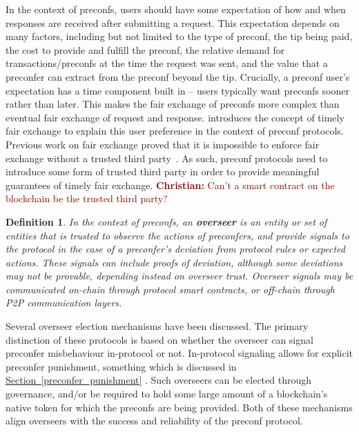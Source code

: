 \documentclass[a4paper]{article}
\theoremstyle{boldstyle}
\newtheorem{definitionx}{Definition}
\newenvironment{definition}
  {\begin{defopenboxq}\begin{definitionx}}
  {\end{definitionx}\end{defopenboxq}}
\newcommand{\chm}[1]{\textcolor{Maroon}{\textbf{Christian:} #1}}
\newcommand{\todoks}[1]{\todo[color=purple!40]{\textbf{Katerina:} #1}}
\begin{document}
    In the context of preconfs, users should have some expectation of how and when responses are received after submitting a request. This expectation depends on many factors, including but not limited to the type of preconf, the tip being paid, the cost to provide and fulfill the preconf, the relative demand for transactions/preconfs at the time the request was sent, and the value that a preconfer can extract from the preconf beyond the tip. Crucially, a preconf user's expectation has a time component built in -- users typically want preconfs sooner rather than later. This makes the fair exchange of preconfs more complex than eventual fair exchange of request and response. \cite{W:PreconfirmationFairExchange} introduces the concept of timely fair exchange to explain this user preference in the context of preconf protocols. Previous work on fair exchange proved that it is impossible to enforce fair exchange without a trusted third party~\cite{P:OntheImpossibilityofFairExchangewithoutaTrustedThirdParty}. As such, preconf protocols need to introduce some form of trusted third party in order to provide meaningful guarantees of timely fair exchange. \chm{Can't a smart contract on the blockchain be the trusted third party?}
    
    \begin{definition}
    \label{def:overseer}
    In the context of preconfs, an \textbf{overseer} is an entity or set of entities that is trusted to observe the actions of preconfers, and provide signals to the protocol in the case of a preconfer's deviation from protocol rules or expected actions. These signals can include proofs of deviation, although some deviations may not be provable, depending instead on overseer trust. Overseer signals may be communicated on-chain through protocol smart contracts, or off-chain through P2P communication layers.
    \end{definition}

    Several overseer election mechanisms have been discussed. The primary distinction of these protocols is based on whether the overseer can signal preconfer misbehaviour in-protocol or not. In-protocol signaling allows for explicit preconfer punishment, something which is discussed in \hyperref[preconfer_punishment]{Section~\ref{preconfer_punishment}} \todoks{internal ref}.
    Such overseers can be elected through governance, and/or be required to hold some large amount of a blockchain's native token for which the preconfs are being provided. Both of these mechanisms align overseers with the success and reliability of the preconf protocol. 
    
\end{document}
